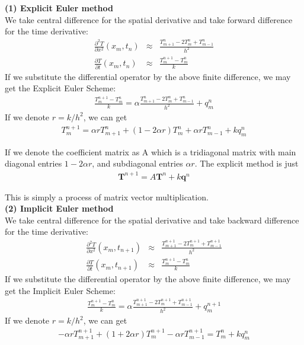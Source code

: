 \documentclass[a4paper,12pt]{article}
\begin{document}
\textbf{(1) Explicit Euler method} \\
We take central difference for the spatial derivative and take forward difference for the time derivative:
\begin{eqnarray}
\frac{\partial ^{2} T}{\partial x^{2}}(x_{m}, t_{n}) &\approx & \frac{T_{m+1}^{n} - 2 T_{m}^{n} + T_{m-1}^{n}}{h^{2}} \\
\frac{\partial T}{\partial t}(x_{m},t_{n}) &\approx & \frac{T_{m}^{n+1} - T_{m}^{n}}{k}
\end{eqnarray}
If we substitute the differential operator by the above finite difference, we may get the Explicit Euler Scheme:
\begin{eqnarray}
\frac{T_{m}^{n+1} - T_{m}^{n}}{k} = \alpha \frac{T_{m+1}^{n} - 2 T_{m}^{n} + T_{m-1}^{n}}{h^{2}} + q_{m}^{n}
\end{eqnarray}
If we denote \(r = k / h^{2} \), we can get
\begin{eqnarray}
T_{m}^{n+1} = \alpha r T_{m+1}^{n} + (1- 2\alpha r) T_{m}^{n} + \alpha r T_{m-1}^{n} + k q_{m}^{n}
\end{eqnarray}

If we denote the coefficient matrix as A which is a tridiagonal matrix with main diagonal entries \(1- 2\alpha r\), and subdiagonal entries \(\alpha r\). The explicit method is just
\begin{eqnarray}
\textbf{T}^{n+1} = A \textbf{T}^{n} + k\textbf{q}^{n}
\end{eqnarray}

This is simply a process of matrix vector multiplication.\\

\textbf{(2) Implicit Euler method}\\
We take central difference for the spatial derivative and take backward difference for the time derivative:
\begin{eqnarray}
\frac{\partial ^{2} T}{\partial x^{2}}(x_{m}, t_{n+1}) &\approx & \frac{T_{m+1}^{n+1} - 2 T_{m}^{n+1} + T_{m-1}^{n+1}}{h^{2}} \\
\frac{\partial T}{\partial t}(x_{m},t_{n+1}) &\approx & \frac{T_{m}^{n+1} - T_{m}^{n}}{k}
\end{eqnarray}
If we substitute the differential operator by the above finite difference, we may get the Implicit Euler Scheme:
\begin{eqnarray}
\frac{T_{m}^{n+1} - T_{m}^{n}}{k} = \alpha \frac{T_{m+1}^{n+1} - 2 T_{m}^{n+1} + T_{m-1}^{n+1}}{h^{2}} + q_{m}^{n+1}
\end{eqnarray}
If we denote \(r = k / h^{2} \), we can get
\begin{eqnarray}
- \alpha r T_{m+1}^{n+1} + (1 + 2\alpha r) T_{m}^{n+1} - \alpha r T_{m-1}^{n+1} = T_{m}^{n} + k q_{m}^{n}
\end{eqnarray}
\end{document}
